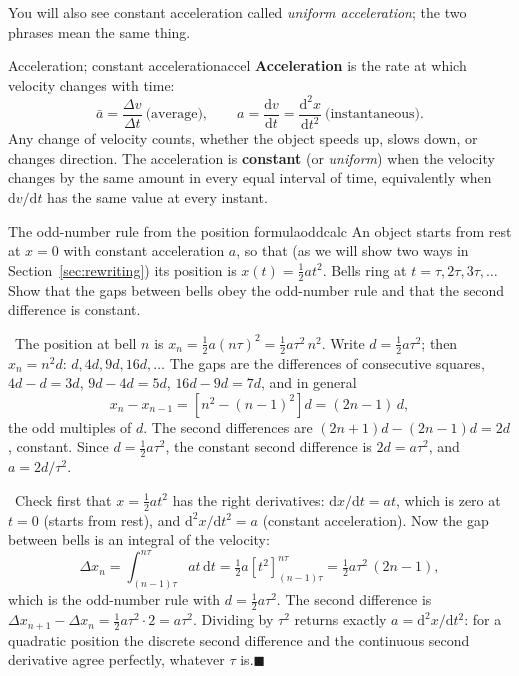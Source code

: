 \documentclass[11pt,twoside,openany]{book}
\newcommand{\dd}{\mathrm{d}}
\newcommand{\deriv}[2]{\frac{\dd #1}{\dd #2}}
\newcommand{\dderiv}[2]{\frac{\dd^2 #1}{\dd #2^2}}
\newcommand{\viewtag}[3]{\fcolorbox{#2}{#3}{\footnotesize\textbf{\textcolor{#2}{#1}}}}
\newcommand{\elemtag}{\viewtag{Elementary}{elemcol}{elempale}}
\newcommand{\calctag}{\viewtag{Calculus}{calccol}{calcpale}}
\newcommand{\elem}{\par\medskip\noindent\elemtag\ }
\newcommand{\calc}{\par\medskip\noindent\calctag\ }
\newcommand{\qed}{\hfill$\blacksquare$}
\begin{document}
You will also see constant acceleration called \emph{uniform acceleration}; the two phrases mean the same thing.

\begin{definition}{Acceleration; constant acceleration}{accel}
\textbf{Acceleration} is the rate at which velocity changes with time:
\[
\bar a = \frac{\Delta v}{\Delta t}\ \text{(average)}, \qquad a = \deriv{v}{t} = \dderiv{x}{t}\ \text{(instantaneous)}.
\]
Any change of velocity counts, whether the object speeds up, slows down, or changes direction. The acceleration is \textbf{constant} (or \emph{uniform}) when the velocity changes by the same amount in every equal interval of time, equivalently when $\dd v/\dd t$ has the same value at every instant.
\end{definition}

\begin{example}{The odd-number rule from the position formula}{oddcalc}
An object starts from rest at $x = 0$ with constant acceleration $a$, so that (as we will show two ways in Section~\ref{sec:rewriting}) its position is $x(t) = \tfrac12 a t^2$. Bells ring at $t = \tau, 2\tau, 3\tau, \ldots$ Show that the gaps between bells obey the odd-number rule and that the second difference is constant.

\elem The position at bell $n$ is $x_n = \tfrac12 a (n\tau)^2 = \tfrac12 a\tau^2\,n^2$. Write $d = \tfrac12 a\tau^2$; then $x_n = n^2 d$: $d, 4d, 9d, 16d, \ldots$ The gaps are the differences of consecutive squares, $4d - d = 3d$, $9d - 4d = 5d$, $16d - 9d = 7d$, and in general
\[
x_n - x_{n-1} = \left[n^2 - (n-1)^2\right]d = (2n-1)\,d,
\]
the odd multiples of $d$. The second differences are $(2n+1)d - (2n-1)d = 2d$, constant. Since $d = \tfrac12 a\tau^2$, the constant second difference is $2d = a\tau^2$, and $a = 2d/\tau^2$.

\calc Check first that $x = \tfrac12 a t^2$ has the right derivatives: $\dd x/\dd t = at$, which is zero at $t = 0$ (starts from rest), and $\dd^2 x/\dd t^2 = a$ (constant acceleration). Now the gap between bells is an integral of the velocity:
\[
\Delta x_n = \int_{(n-1)\tau}^{n\tau} a t\,\dd t = \tfrac12 a\left[t^2\right]_{(n-1)\tau}^{n\tau} = \tfrac12 a\tau^2\,(2n-1),
\]
which is the odd-number rule with $d = \tfrac12 a\tau^2$. The second difference is $\Delta x_{n+1} - \Delta x_n = \tfrac12 a\tau^2 \cdot 2 = a\tau^2$. Dividing by $\tau^2$ returns exactly $a = \dd^2 x/\dd t^2$: for a quadratic position the discrete second difference and the continuous second derivative agree perfectly, whatever $\tau$ is.\qed
\end{example}
\end{document}
